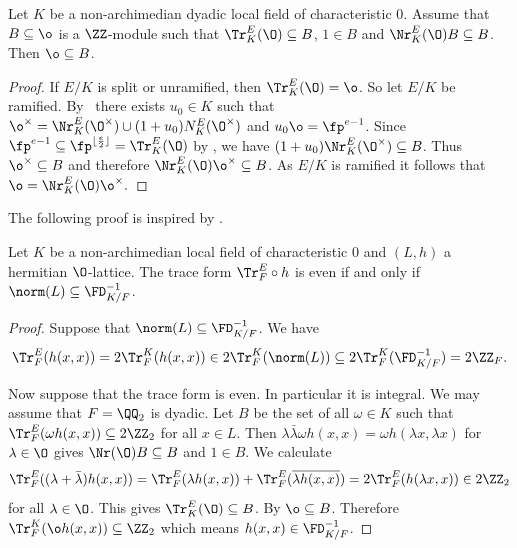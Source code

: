 \begin{lemma}\label{normhelp}
  Let $K$ be a non-archimedian dyadic local field of characteristic $0$.
  Assume that $B \subseteq \o$ is a $\ZZ$-module such that $\Tr^E_K(\O) \subseteq B$, $1 \in B$ and $\Nr^E_K(\O)B \subseteq B$. Then $\o \subseteq B$.
\end{lemma}

\begin{proof}
If $E/K$ is split or unramified, then $\Tr^E_K(\O)=\o$. So let $E/K$ be ramified.
  By~\cite[\S 6]{Johnson1968} there exists $u_0 \in K$ such that $\o^\times = \Nr^E_K(\O^\times) \cup (1+u_0) N^E_K(\O^\times)$ and $u_0 \o = \fp^{e-1}$. Since $\fp^{e-1} \subseteq \fp^{\lfloor\frac{e}{2}\rfloor}=\Tr^E_K(\O)$ by \cite[Ch. V,\S3, Lemma 3]{Serre1979}, we have $(1+u_0) \Nr^E_K(\O^\times) \subseteq B$.
  Thus $\o^\times \subseteq B$ and therefore $\Nr^E_K(\O) \o^\times \subseteq B$. As $E/K$ is ramified it follows that $\o= \Nr^E_K(\O) \o^\times.$
\end{proof}

The following proof is inspired by \cite[3.1.9]{michael2015}.
\begin{proposition}\label{eventracelocal}
Let $K$ be a non-archimedian local field of characteristic $0$ and $(L,h)$ a hermitian $\O$-lattice.
The trace form $\Tr^E_F \circ h$ is even if and only if
  $\norm(L) \subseteq \FD_{K/F}^{-1}$.
\end{proposition}

\begin{proof}
  Suppose that $\norm(L)  \subseteq {\FD_{K/F}^{-1}}$.
We have
  \[\Tr^E_F(h(x,x))= 2 \Tr^K_F(h(x,x)) \in 2 \Tr^K_F(\norm(L)) \subseteq 2 \Tr^K_F({\FD_{K/F}^{-1}})=2 \ZZ_F.\]

Now suppose that the trace form is even. In particular it is integral.
We may assume that $F = \QQ_2$ is dyadic.
Let $B$ be the set of all $\omega \in K$ such that
$\Tr^{E}_F(\omega h(x,x))\subseteq 2\ZZ_2$ for all $x \in L$. Then $\lambda \bar \lambda \omega h(x,x)=\omega h(\lambda x,\lambda x)$ for $\lambda \in \O$ gives $\Nr(\O) B \subseteq B$ and $1 \in B$. We calculate
  \[\Tr^E_F((\lambda +\bar \lambda) h(x,x)) = \Tr^E_F (\lambda h(x,x))+ \Tr^E_F (\overline{ \lambda h(x,x)}) = 2 \Tr^E_F(h(\lambda x,x)) \in 2\ZZ_2 \]
  for all $\lambda \in \O$.
This gives $\Tr^E_K(\O) \subseteq B$.
By  $\o \subseteq B$.
  Therefore $\Tr^K_F(\o h(x,x))\subseteq \ZZ_2$ which means $h(x,x)\in {\FD_{K/F}^{-1}}$.
\end{proof}

